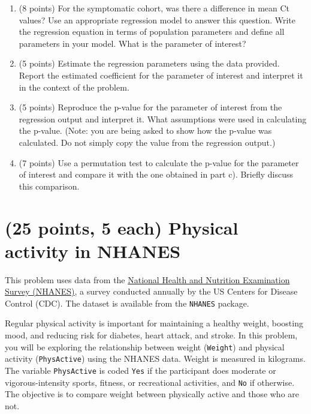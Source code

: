 \documentclass[letterpaper,12pt,twoside,]{pinp}
\begin{document}
\begin{enumerate}
\def\labelenumi{\alph{enumi})}
\item
  (8 points) For the symptomatic cohort, was there a difference in mean
  Ct values? Use an appropriate regression model to answer this
  question. Write the regression equation in terms of population
  parameters and define all parameters in your model. What is the
  parameter of interest?
\item
  (5 points) Estimate the regression parameters using the data provided.
  Report the estimated coefficient for the parameter of interest and
  interpret it in the context of the problem.
\item
  (5 points) Reproduce the p-value for the parameter of interest from
  the regression output and interpret it. What assumptions were used in
  calculating the p-value. (Note: you are being asked to show how the
  p-value was calculated. Do not simply copy the value from the
  regression output.)
\item
  (7 points) Use a permutation test to calculate the p-value for the
  parameter of interest and compare it with the one obtained in part c).
  Briefly discuss this comparison.
\end{enumerate}

\newpage

\hypertarget{points-5-each-physical-activity-in-nhanes}{%
\section{(25 points, 5 each) Physical activity in
NHANES}\label{points-5-each-physical-activity-in-nhanes}}

This problem uses data from the
\href{https://cran.r-project.org/web/packages/NHANES/NHANES.pdf}{National
Health and Nutrition Examination Survey (NHANES)}, a survey conducted
annually by the US Centers for Disease Control (CDC). The dataset is
available from the \texttt{NHANES} package.

Regular physical activity is important for maintaining a healthy weight,
boosting mood, and reducing risk for diabetes, heart attack, and stroke.
In this problem, you will be exploring the relationship between weight
(\texttt{Weight}) and physical activity (\texttt{PhysActive}) using the
NHANES data. Weight is measured in kilograms. The variable
\texttt{PhysActive} is coded \texttt{Yes} if the participant does
moderate or vigorous-intensity sports, fitness, or recreational
activities, and \texttt{No} if otherwise. The objective is to compare
weight between physically active and those who are not.
\end{document}
